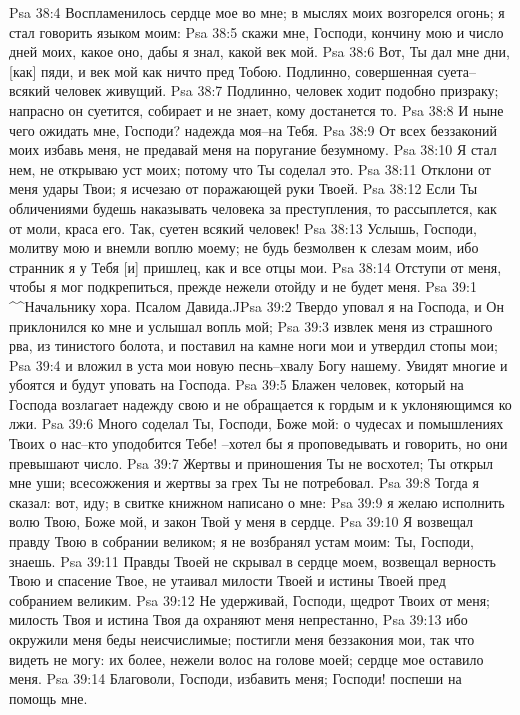 Psa 38:4  Воспламенилось сердце мое во мне; в мыслях моих возгорелся огонь; я стал говорить языком моим:
Psa 38:5  скажи мне, Господи, кончину мою и число дней моих, какое оно, дабы я знал, какой век мой.
Psa 38:6  Вот, Ты дал мне дни, [как] пяди, и век мой как ничто пред Тобою. Подлинно, совершенная суета--всякий человек живущий.
Psa 38:7  Подлинно, человек ходит подобно призраку; напрасно он суетится, собирает и не знает, кому достанется то.
Psa 38:8  И ныне чего ожидать мне, Господи? надежда моя--на Тебя.
Psa 38:9  От всех беззаконий моих избавь меня, не предавай меня на поругание безумному.
Psa 38:10  Я стал нем, не открываю уст моих; потому что Ты соделал это.
Psa 38:11  Отклони от меня удары Твои; я исчезаю от поражающей руки Твоей.
Psa 38:12  Если Ты обличениями будешь наказывать человека за преступления, то рассыплется, как от моли, краса его. Так, суетен всякий человек!
Psa 38:13  Услышь, Господи, молитву мою и внемли воплю моему; не будь безмолвен к слезам моим, ибо странник я у Тебя [и] пришлец, как и все отцы мои.
Psa 38:14  Отступи от меня, чтобы я мог подкрепиться, прежде нежели отойду и не будет меня.
Psa 39:1  ^^Начальнику хора. Псалом Давида.^^
Psa 39:2  Твердо уповал я на Господа, и Он приклонился ко мне и услышал вопль мой;
Psa 39:3  извлек меня из страшного рва, из тинистого болота, и поставил на камне ноги мои и утвердил стопы мои;
Psa 39:4  и вложил в уста мои новую песнь--хвалу Богу нашему. Увидят многие и убоятся и будут уповать на Господа.
Psa 39:5  Блажен человек, который на Господа возлагает надежду свою и не обращается к гордым и к уклоняющимся ко лжи.
Psa 39:6  Много соделал Ты, Господи, Боже мой: о чудесах и помышлениях Твоих о нас--кто уподобится Тебе! --хотел бы я проповедывать и говорить, но они превышают число.
Psa 39:7  Жертвы и приношения Ты не восхотел; Ты открыл мне уши; всесожжения и жертвы за грех Ты не потребовал.
Psa 39:8  Тогда я сказал: вот, иду; в свитке книжном написано о мне:
Psa 39:9  я желаю исполнить волю Твою, Боже мой, и закон Твой у меня в сердце.
Psa 39:10  Я возвещал правду Твою в собрании великом; я не возбранял устам моим: Ты, Господи, знаешь.
Psa 39:11  Правды Твоей не скрывал в сердце моем, возвещал верность Твою и спасение Твое, не утаивал милости Твоей и истины Твоей пред собранием великим.
Psa 39:12  Не удерживай, Господи, щедрот Твоих от меня; милость Твоя и истина Твоя да охраняют меня непрестанно,
Psa 39:13  ибо окружили меня беды неисчислимые; постигли меня беззакония мои, так что видеть не могу: их более, нежели волос на голове моей; сердце мое оставило меня.
Psa 39:14  Благоволи, Господи, избавить меня; Господи! поспеши на помощь мне.
